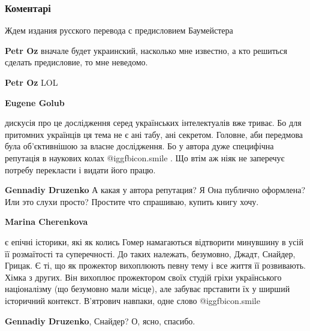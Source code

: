  
 
 
 
 
\subsubsection{Коментарі}
\label{sec:14_11_2021.fb.golub_evgenij.kiev.1.oun_upa_holokost.cmt}

\begin{itemize} %
Ждем издания русского перевода с предисловием Баумейстера

\begin{itemize} %
\textbf{Petr Oz} вначале будет украинский, насколько мне известно, а кто решиться сделать предисловие, то мне неведомо.

\textbf{Petr Oz} LOL


\textbf{Eugene Golub} 

дискусія про це дослідження серед українських інтелектуалів вже триває. Бо для
притомних українців ця тема не є ані табу, ані секретом. Головне, аби передмова
була об’єктивнішою за власне дослідження. Бо у автора дуже специфічна репутація
в наукових колах  @igg{fbicon.smile} . Що втім аж ніяк не заперечує потребу перекласти і видати
його працю.

\textbf{Gennadiy Druzenko} А какая у автора репутация? Я Она публично оформлена? Или это слухи просто? Простите что спрашиваю, купить книгу хочу.


\textbf{Marina Cherenkova} 

є епічні історики, які як колись Гомер намагаються відтворити минувшину в усій
її розмаїтості та суперечності. До таких належать, безумовно, Джадт, Снайдер,
Грицак. Є ті, що як прожектор вихоплюють певну тему і все життя її розвивають.
Хімка з других. Він вихоплює прожектором своїх студій гріхи українського
націоналізму (що безумовно мали місце), але забуває прставити їх у ширший
історичний контекст. В’ятрович навпаки, одне слово  @igg{fbicon.smile} 

\textbf{Gennadiy Druzenko}, Снайдер? О, ясно, спасибо.


\end{itemize}
\end{itemize}
